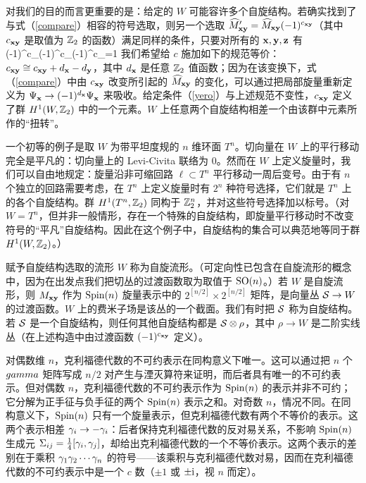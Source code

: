 对我们的目的而言更重要的是：给定的 $W$ 可能容许多个自旋结构。若确实找到了与式（\ref{compare}）相容的符号选取，则另一个选取 $\h M'_{\x \y} =\h M_{\x \y} (-1)^{c_{\x \y}}$（其中 $c_{\x \y}$ 是取值为 $\Z_2$ 的函数）满足同样的条件，只要对所有的 $\x,\y,\z$ 有
\be\label{yero}(-1)^{c_{\x \y}}(-1)^{c_{\y \z}}(-1)^{c_{\z \x}}=1\ee
我们希望给 $c$ 施加如下的规范等价：$c_{\x\y}\cong c_{\x\y}+d_\x-d_\y$，其中 $d_\x$ 是任意 $\Z_2$ 值函数；因为在该变换下，式（\ref{compare}）中由 $c_{\x\y}$ 改变所引起的 $\h M_{\x\y}$ 的变化，可以通过把局部旋量重新定义为 $\Psi_\x\to (-1)^{d_\x}\Psi_\x$ 来吸收。给定条件（\ref{yero}）与上述规范不变性，$c_{\x\y}$ 定义了群 $H^1(W,\Z_2)$ 中的一个元素。$W$ 上任意两个自旋结构相差一个由该群中元素所作的“扭转”。

一个初等的例子是取 $W$ 为带平坦度规的 $n$ 维环面 $T^n$。切向量在 $W$ 上的平行移动完全是平凡的：切向量上的 Levi-Civita 联络为 0。然而在 $W$ 上定义旋量时，我们可以自由地规定：旋量沿非可缩回路 $\ell\subset T^n$ 平行移动一周后变号。由于有 $n$ 个独立的回路需要考虑，在 $T^n$ 上定义旋量时有 $2^n$ 种符号选择，它们就是 $T^n$ 上的各个自旋结构。群 $H^1(T^n,\Z_2)$ 同构于 $\Z_2^n$，并对这些符号选择加以标号。（对 $W=T^n$，但并非一般情形，存在一个特殊的自旋结构，即旋量平行移动时不改变符号的“平凡”自旋结构。因此在这个例子中，自旋结构的集合可以典范地等同于群 $H^1(W,\Z_2)$。）

赋予自旋结构选取的流形 $W$ 称为自旋流形。（可定向性已包含在自旋流形的概念中，因为在出发点我们把切丛的过渡函数取为取值于 $\SO(n)$。）若 $W$ 是自旋流形，则 $M_{\x\y}$ 作为 $\Spin(n)$ 旋量表示中的 $2^{[n/2]}\times 2^{[n/2]}$ 矩阵，是向量丛 $\S\to W$ 的过渡函数。$W$ 上的费米子场是该丛的一个截面。我们有时把 $\S$ 称为自旋结构。若 $\S$ 是一个自旋结构，则任何其他自旋结构都是 $\S\otimes \rho$，其中 $\rho\to W$ 是二阶实线丛（在上述构造中由过渡函数 $(-1)^{c_{\x\y}}$ 定义）。

对偶数维 $n$，克利福德代数的不可约表示在同构意义下唯一。这可以通过把 $n$ 个 $\\gamma$ 矩阵写成 $n/2$ 对产生与湮灭算符来证明，而后者具有唯一的不可约表示。但对偶数 $n$，克利福德代数的不可约表示作为 $\Spin(n)$ 的表示并非不可约；它分解为正手征与负手征的两个 $\Spin(n)$ 表示之和。对奇数 $n$，情况不同。在同构意义下，$\Spin(n)$ 只有一个旋量表示，但克利福德代数有两个不等价的表示。这两个表示相差 $\g_i\to -\g_i$：后者保持克利福德代数的反对易关系，不影响 $\Spin(n)$ 生成元 $\Sigma_{ij}=\frac{1}{4}[\g_i,\g_j]$，却给出克利福德代数的一个不等价表示。这两个表示的差别在于乘积 $\g_1\g_2\cdots \g_n$ 的符号------该乘积与克利福德代数对易，因而在克利福德代数的不可约表示中是一个 $c$ 数（$\pm 1$ 或 $\pm \i$，视 $n$ 而定）。

